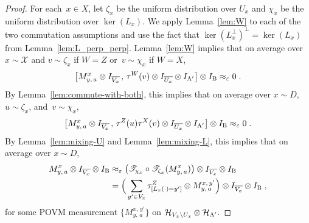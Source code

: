 \documentclass[11pt]{article}
\theoremstyle{definition}
\newcommand{\Id}{\ensuremath{I}}
\newcommand{\mH}{\ensuremath{\mathcal{H}}}
\newcommand{\eps}{\varepsilon}
\newcommand{\labelstyle}[1]{\ensuremath{\textsc{#1}}\xspace}
\newcommand{\alice}{\labelstyle{A}}
\newcommand{\bob}{\labelstyle{B}}
\renewcommand{\cal}[1]{\mathcal{#1}}
\begin{document}
\begin{proof}
  For each~$x \in X$, let $\zeta_{x}$ be the uniform distribution over $U_x$ and
  $\chi_{x}$ be the uniform distribution over $\ker(L_x)$.
  We apply Lemma~\ref{lem:W} to each of the two commutation assumptions and
  use the fact that $\ker(L_x^\perp)^\perp = \ker(L_x)$ from
  Lemma~\ref{lem:L_perp_perp}.
  Lemma~\ref{lem:W} implies that on average over $x \sim \cal{X}$ and $v \sim \zeta_{x}$ if
  $W=Z$ or~$v \sim \chi_{x}$ if $W=X$,
  \begin{equation*}
    \bigl[ M^{x}_{y,\, a} \otimes \Id_{\overline{V_x}} \,,\, \tau^W(v) \otimes
    \Id_{\overline{U_x}} \otimes \Id_{\alice'} \bigr]  \otimes \Id_\bob
    \approx_\eps 0\;.
  \end{equation*}
  By Lemma~\ref{lem:commute-with-both}, this implies that on average over $x
  \sim D$, $u \sim \zeta_{x}$, and~$v \sim \chi_{x}$,
  \begin{equation*}
    \bigl[ M^{x}_{y,\, a} \otimes \Id_{\overline{V_x}} \,,\, \tau^Z(u) \tau^X(v)
    \otimes \Id_{\overline{U_x}} \otimes \Id_{\alice'} \bigr] \otimes \Id_\bob
    \approx_\eps 0\;.
  \end{equation*}
  By Lemma~\ref{lem:mixing-U} and Lemma~\ref{lem:mixing-L},
  this implies that on average over $x\sim D$,
  \begin{align}
    M^{x}_{y,\, a} \otimes \Id_{\overline{V_x}} \otimes \Id_\bob
    & \approx_\eps \bigl( \mathscr{T}_{\chi_{x}} \circ \mathscr{T}_{\zeta_{x}} (
      M^{x}_{y,\, a}) \bigr) \otimes \Id_{\overline{V_x}} \otimes
      \Id_\bob\notag\\
    & = \Big(\sum_{y' \in V_x} \tau^Z_{[L_x(\cdot) = y']} \otimes  M^{x,\,
      y'}_{y,\, a} \Big) \otimes \Id_{\overline{V_x}} \otimes
      \Id_\bob\;,\label{eq:mixing-eq-1}
  \end{align}
	for some POVM measurement $\{M^{x,\, y'}_{y,\, a} \}$ on $\mH_{V_x \setminus
    U_x} \otimes \mH_{\alice'}$.
	

\end{proof}
\end{document}
